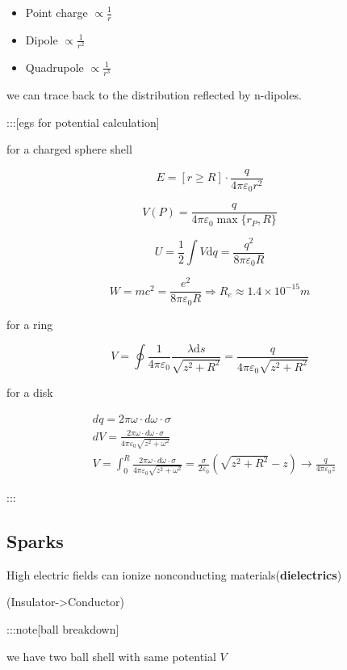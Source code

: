 \documentclass[
]{article}
\providecommand{\tightlist}{%
  \setlength{\itemsep}{0pt}\setlength{\parskip}{0pt}}
\begin{document}
\begin{itemize}
\tightlist
\item
  Point charge \(\propto \frac{1}{r}\)
\item
  Dipole \(\propto \frac{1}{r^2}\)
\item
  Quadrupole \(\propto \frac{1}{r^3}\)
\end{itemize}

we can trace back to the distribution reflected by n-dipoles.

:::{[}egs for potential calculation{]}

for a charged sphere shell

\[
E=[r\geqslant R]\cdot \frac{q}{4\pi \varepsilon _0r^2}
\]

\[
V(P)=\frac{q}{4\pi \varepsilon _0\max \{r_P,R\}}
\]

\[
U=\frac{1}{2}
\int V\mathrm d q=\frac{q^2}{8\pi \varepsilon _0 R}
\]

\[
W=mc^2=\frac{e^2}{8\pi \varepsilon _0R}\Rightarrow R_e\approx 1.4\times 10^{-15}m
\]

for a ring

\[
V=\oint \frac{1}{4\pi \varepsilon _0}\frac{\lambda \mathrm d s}{\sqrt{z^2+R^2}}=\frac{q}{4\pi \varepsilon _0 \sqrt{z^2+R^2}}
\]

for a disk

\[
\begin{aligned}
&dq=2\pi\omega\cdot d\omega\cdot\sigma \\
&dV=\frac{2\pi\omega\cdot d\omega\cdot\sigma}{4\pi\varepsilon_{0}\sqrt{z^{2}+\omega^{2}}} \\
&V=\int_{0}^{R}\frac{2\pi\omega\cdot d\omega\cdot\sigma}{4\pi\varepsilon_{0}\sqrt{z^{2}+\omega^{2}}}=\frac{\sigma}{2\varepsilon_{0}}(\sqrt{z^{2}+R^{2}}-z)\to \frac{q}{4\pi \varepsilon _0 z}
\end{aligned}
\]

:::

\hypertarget{sparks}{%
\subsection{Sparks}\label{sparks}}

High electric fields can ionize nonconducting
materials(\textbf{dielectrics})

(Insulator-\textgreater Conductor)

:::note{[}ball breakdown{]}

we have two ball shell with same potential \(V\)
\end{document}
